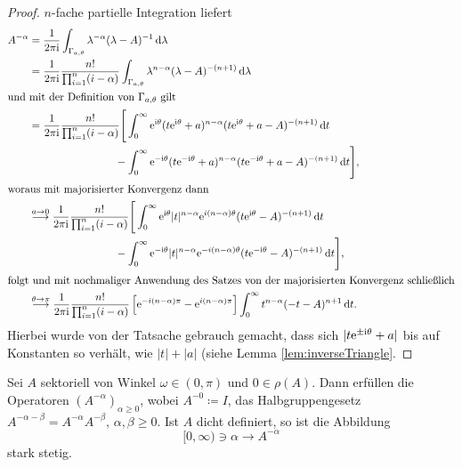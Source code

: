 \begin{proof}
  $n$-fache partielle Integration liefert
  \begin{align*}
    A^{-\alpha}
    &= \frac{1}{2\pi \mathrm{i}} \int_{\Gamma_{a, \theta}} \lambda^{-\alpha} (\lambda - A)^{-1} \, {\operatorname{d}\!{\lambda}} \\
    &= \frac{1}{2\pi \mathrm{i}} \frac{n!}{\prod_{i = 1}^n (i - \alpha)} \int_{\Gamma_{a , \theta}} \lambda^{n - \alpha} (\lambda - A)^{-(n+1)} \, {\operatorname{d}\!{\lambda}} \\
    \intertext{und mit der Definition von $\Gamma_{a,\theta}$ gilt}
    &= \frac{1}{2\pi \mathrm{i}} \frac{n!}{\prod_{i = 1}^n ( i - \alpha )} \Bigg[ \int_0^\infty \mathrm{e}^{\mathrm{i}\theta} (t \mathrm{e}^{\mathrm{i}\theta} + a )^{n - \alpha} (t \mathrm{e}^{\mathrm{i}\theta} + a - A)^{-(n+1)} \, {\operatorname{d}\!{t}}  \\
    &\quad\quad\quad\quad\quad\quad\quad\quad- \int_0^\infty \mathrm{e}^{-\mathrm{i}\theta} (t \mathrm{e}^{-\mathrm{i}\theta} + a)^{n - \alpha} (t \mathrm{e}^{-\mathrm{i}\theta} + a - A)^{-(n + 1)} \, {\operatorname{d}\!{t}}\Bigg], \\
    \intertext{woraus mit majorisierter Konvergenz dann}
    &\overset{a \to 0}{\longrightarrow} \frac{1}{2\pi \mathrm{i}} \frac{n!}{\prod_{i = 1}^n ( i - \alpha )} 
    \Bigg[ \int_0^\infty \mathrm{e}^{\mathrm{i}\theta} |t|^{n - \alpha} \mathrm{e}^{i(n - \alpha)\theta} (t \mathrm{e}^{\mathrm{i}\theta} - A)^{-(n+1)} \, {\operatorname{d}\!{t}}  \\
    &\quad\quad\quad\quad\quad\quad\quad\quad - \int_0^\infty \mathrm{e}^{-\mathrm{i}\theta} |t|^{n - \alpha} \mathrm{e}^{-i(n - \alpha)\theta} (t \mathrm{e}^{-\mathrm{i}\theta} - A)^{-(n + 1)} \, {\operatorname{d}\!{t}}\Bigg],\\
    \intertext{folgt und mit nochmaliger Anwendung des Satzes von der majorisierten Konvergenz schließlich}
    &\overset{\theta \to \pi}{\longrightarrow} \frac{1}{2\pi \mathrm{i}} \frac{n!}{\prod_{i = 1}^n (i - \alpha)}
    \left[ \mathrm{e}^{-i (n - \alpha) \pi} - \mathrm{e}^{i (n - \alpha)\pi} \right] \int_0^\infty t^{n -\alpha} (-t - A)^{n + 1} \, {\operatorname{d}\!{t}}.
  \end{align*}
  Hierbei wurde von der Tatsache gebrauch gemacht, dass sich $|t \mathrm{e}^{\pm \mathrm{i} \theta} + a|$ bis auf Konstanten so verhält, wie $|t| + |a|$ (siehe Lemma \ref{lem:inverseTriangle}.
\end{proof}

\begin{thm}
  \label{thm:fracPowSemigroup}
  Sei $A$ sektoriell von Winkel $\omega \in (0,\pi)$ und $0 \in \rho(A)$.
  Dann erfüllen die Operatoren $(A^{-\alpha})_{\alpha \geq 0}$, wobei $A^{-0} \coloneqq I$, das Halbgruppengesetz $A^{-\alpha - \beta} = A^{-\alpha} A^{-\beta}$, $\alpha,\beta \geq 0$.
  Ist $A$ dicht definiert, so ist die Abbildung
  $$
  [0,\infty) \ni \alpha \to A^{-\alpha}
  $$
  stark stetig.
\end{thm}

